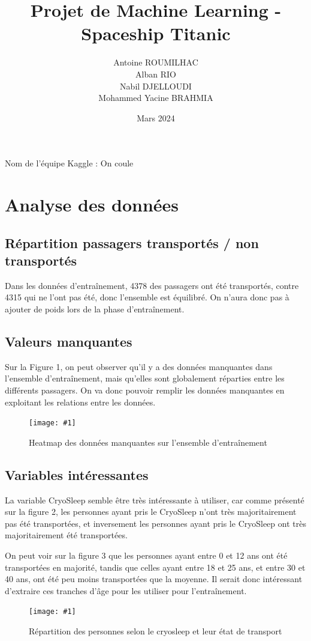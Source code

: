 \documentclass[a4paper]{article}
\title{Projet de Machine Learning - Spaceship Titanic}
\author{Antoine ROUMILHAC \\ Alban RIO \\ Nabil DJELLOUDI \\ Mohammed Yacine BRAHMIA}
\date{Mars 2024}
\newcommand{\illustration}[3]{
    \begin{figure}[h!]
        \centering
        \texttt{[image: \#1]}
        \caption{#2}
    \end{figure}
}
\begin{document}
    \maketitle

    Nom de l'équipe Kaggle : On coule

    \section{Analyse des données}

    \subsection{Répartition passagers transportés / non transportés}

    Dans les données d'entraînement, 4378 des passagers ont été transportés, contre 4315 qui ne l'ont pas été, donc l'ensemble est équilibré. On n'aura donc pas à ajouter de poids lors de la phase d'entraînement.

    \subsection{Valeurs manquantes}

    
    Sur la Figure 1, on peut observer qu'il y a des données manquantes dans l'ensemble d'entraînement, mais qu'elles sont globalement réparties entre les différents passagers.
    On va donc pouvoir remplir les données manquantes en exploitant les relations entre les données.
    
    \illustration{images/Figure 1.png}{Heatmap des données manquantes sur l'ensemble d'entraînement}{6cm}
    \subsection{Variables intéressantes}

    La variable CryoSleep semble être très intéressante à utiliser, car comme présenté sur la figure 2, les personnes ayant pris le CryoSleep n'ont très majoritairement pas été transportées,
    et inversement les personnes ayant pris le CryoSleep ont très majoritairement été transportées.
    
    On peut voir sur la figure 3 que les personnes ayant entre 0 et 12 ans ont été transportées en majorité, 
    tandis que celles ayant entre 18 et 25 ans, et entre 30 et 40 ans, ont été peu moins transportées que la moyenne.
    Il serait donc intéressant d'extraire ces tranches d'âge pour les utiliser pour l'entraînement.
    \illustration{images/Figure 2.png}{Répartition des personnes selon le cryosleep et leur état de transport}{6cm}
\end{document}
